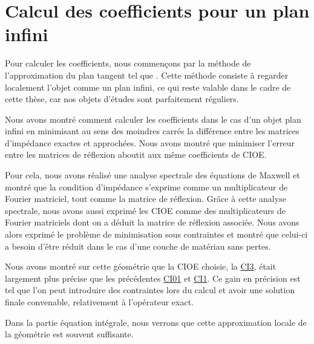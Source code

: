 \chapter{Calcul des coefficients pour un plan infini}
\label{sec:plan}
\minitoc
\newpage
{}
Pour calculer les coefficients, nous commençons par la méthode de l'approximation du plan tangent tel que \cite{hoppe_impedance_1995,marceaux_high-order_2000,aubakirov_electromagnetic_2014}. Cette méthode consiste à regarder localement l'objet comme un plan infini, ce qui reste valable dans le cadre de cette thèse, car nos objets d'études sont parfaitement réguliers.








Nous avons montré comment calculer les coefficients dans le cas d'un objet plan infini en minimisant au sens des moindres carrés la différence entre les matrices d'impédance exactes et approchées.
Nous avons montré que minimiser l'erreur entre les matrices de réflexion aboutit aux même coefficients de CIOE.

Pour cela, nous avons réalisé une analyse spectrale des équations de Maxwell et montré que la condition d'impédance s'exprime comme un multiplicateur de Fourier matriciel, tout comme la matrice de réflexion. Grâce à cette analyse spectrale, nous avons aussi exprimé les CIOE comme des multiplicateurs de Fourier matriciels dont on a déduit la matrice de réflexion associée. Nous avons alors exprimé le problème de minimisation sous contraintes et montré que celui-ci a besoin d'être réduit dans le cas d'une couche de matériau sans pertes.

Nous avons montré sur cette géométrie que la CIOE choisie, la \hyperlink{ci3}{CI3}, était largement plus précise que les précédentes \hyperlink{ci01}{CI01} et \hyperlink{ci1}{CI1}. Ce gain en précision est tel que l'on peut introduire des contraintes lors du calcul et avoir une solution finale convenable, relativement à l'opérateur exact.

Dans la partie équation intégrale, nous verrons que cette approximation locale de la géométrie est souvent suffisante.
